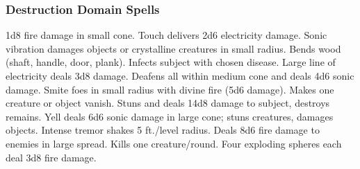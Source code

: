 \subsubsection{Destruction Domain Spells}
\begin{spelllist}
   1d8 fire damage in small cone.
   Touch delivers 2d6 electricity damage.
   Sonic vibration damages objects or crystalline creatures in small radius.
   Bends wood (shaft, handle, door, plank).
   Infects subject with chosen disease.
   Large line of electricity deals 3d8 damage.
   Deafens all within medium cone and deals 4d6 sonic damage.
  \spellhead[4]{}
   Smite foes in small radius with divine fire (5d6 damage).
  \spellhead[5]{}
   Makes one creature or object vanish.
  \F Stuns and deals 14d8 damage to subject, destroys remains.
   Yell deals 6d6 sonic damage in large cone; stuns creatures, damages objects.
   Intense tremor shakes 5 ft./level radius.
   Deals 8d6 fire damage to enemies in large spread.
   Kills one creature/round.
   Four exploding spheres each deal 3d8 fire damage.
\end{spelllist}

